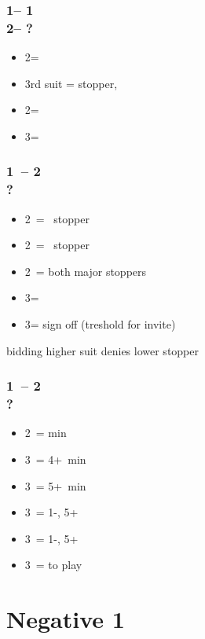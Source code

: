 \subsubsection*{1\diams -- 1\major\\
                2\diams -- ?}
\begin{itemize}
    \item 2\major = \nf
    \item 3rd suit = stopper, \gf
    \item 2\nt = \gf
    \item 3\diams = \inv
\end{itemize}

\subsubsection*{1\diams\ -- 2\diams \\ ?}
\begin{itemize}
    \item 2\hearts\ = \hearts\ stopper
    \item 2\spades\ = \spades\ stopper
    \item 2\nt\ = both major stoppers
    \item 3\clubs = \nat
    \item 3\diams = sign off (treshold for invite)
\end{itemize}

bidding higher suit denies lower stopper

\subsubsection*{1\diams\ -- 2\spades \\ ?}
\begin{itemize}
    \item 2\nt\ = \bal min
    \item 3\clubs\ = 4+\clubs\ min
    \item 3\diams\ = 5+\diams\ min
    \item 3\hearts\ = 1-\hearts, 5+\diams\ \gf
    \item 3\spades\ = 1-\spades, 5+\diams\ \gf
    \item 3\nt\ = to play
\end{itemize}

\section{\texorpdfstring{Negative 1\diams}{1dNegative}}\label{sec:1dNegative}

